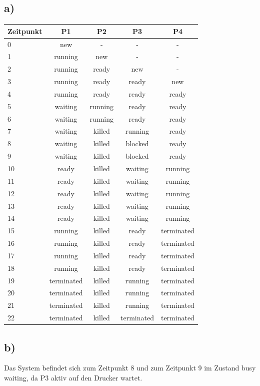 \documentclass[numbers=noendperiod]{scrartcl}
\begin{document}
\subsection*{a)}
\begin{tabular}{|l|c|c|c|c|} \hline
	Zeitpunkt & P1 & P2 & P3 & P4 \\ \hline
	0 & new & - & - & - \\ \hline
	1 & running & new & - & - \\ \hline
	2 & running & ready  & new & - \\ \hline
	3 & running & ready & ready & new \\ \hline
	4 & running & ready & ready & ready \\ \hline
	5 & waiting & running & ready & ready \\ \hline
	6 & waiting & running & ready & ready \\ \hline
	7 & waiting & killed & running & ready \\ \hline
	8 & waiting & killed & blocked & ready \\ \hline
	9 & waiting & killed & blocked & ready \\ \hline
	10 & ready & killed & waiting & running \\ \hline
	11 & ready & killed & waiting & running \\ \hline
	12 & ready & killed & waiting & running \\ \hline
	13 & ready & killed & waiting & running \\ \hline
	14 & ready & killed & waiting & running \\ \hline
	15 & running & killed & ready & terminated \\ \hline
	16 & running & killed & ready & terminated \\ \hline
	17 & running & killed & ready & terminated \\ \hline
	18 & running & killed & ready & terminated \\ \hline
	19 & terminated & killed & running & terminated \\ \hline
	20 & terminated & killed & running & terminated \\ \hline
	21 & terminated & killed & running & terminated \\ \hline
	22 & terminated & killed & terminated & terminated \\ \hline
	
\end{tabular}	
\subsection*{b)}
Das System befindet sich zum Zeitpunkt 8 und zum Zeitpunkt 9 im Zustand busy waiting, da P3 aktiv auf den Drucker wartet.
\end{document}
